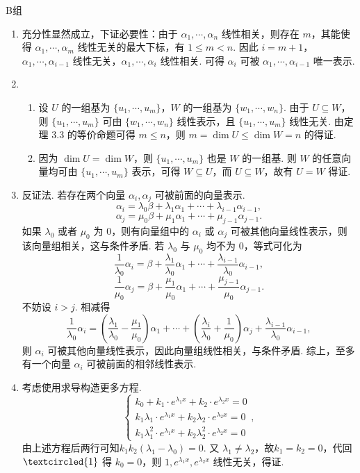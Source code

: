 \centerline{\heiti B组}
\begin{enumerate}
    \item 充分性显然成立，下证必要性：由于 $\alpha_1,\cdots,\alpha_n$ 线性相关，则存在 $m$，其能使得 $\alpha_1,\cdots,\alpha_m$ 线性无关的最大下标，有 $1\le m<n$. 因此 $i=m+1$，$\alpha_1,\cdots,\alpha_{i-1}$ 线性无关，$\alpha_1,\cdots,\alpha_i$ 线性相关. 可得 $\alpha_i$ 可被 $\alpha_1,\cdots,\alpha_{i-1}$ 唯一表示.

    \item \begin{enumerate}
        \item 设 $U$ 的一组基为 $\{u_1,\cdots,u_m\}$，$W$ 的一组基为 $\{w_1,\cdots,w_n\}$. 由于 $U\subseteq W$，则 $\{u_1,\cdots,u_m\}$ 可由 $\{w_1,\cdots,w_n\}$ 线性表示，且 $\{u_1,\cdots,u_m\}$ 线性无关. 由定理 $3.3$ 的等价命题可得 $m\le n$，则 $m=\dim U\le\dim W=n$ 的得证.
        \item 因为 $\dim U=\dim W$，则 $\{u_1,\cdots,u_m\}$ 也是 $W$ 的一组基. 则 $W$ 的任意向量均可由 $\{u_1,\cdots,u_m\}$ 表示，可得 $W\subseteq U$，而 $U\subseteq W$，故有 $U=W$ 得证.
    \end{enumerate}

    \item 反证法. 若存在两个向量 $\alpha_i,\alpha_j$ 可被前面的向量表示.
	\[\alpha_i=\lambda_0\beta+\lambda_1\alpha_1+\cdots+\lambda_{i-1}\alpha_{i-1},\]
	\[\alpha_j=\mu_0\beta+\mu_1\alpha_1+\cdots+\mu_{j-1}\alpha_{j-1}.\]
	如果 $\lambda_0$ 或者 $\mu_0$ 为 $0$，则有向量组中的 $\alpha_i$ 或 $\alpha_j$ 可被其他向量线性表示，则该向量组相关，这与条件矛盾. 若 $\lambda_0$ 与 $\mu_0$ 均不为 $0$，等式可化为
	\[\frac 1{\lambda_0}\alpha_i=\beta+\frac{\lambda_1}{\lambda_0}\alpha_1+\cdots+\frac{\lambda_{i-1}}{\lambda_0}\alpha_{i-1},\]
	\[\frac 1{\mu_0}\alpha_j=\beta+\frac{\mu_1}{\mu_0}\alpha_1+\cdots+\frac{\mu_{j-1}}{\mu_0}\alpha_{j-1}.\]
	不妨设 $i>j$. 相减得
	\[\frac 1{\lambda_0}\alpha_i=(\frac{\lambda_1}{\lambda_0}-\frac{\mu_1}{\mu_0})\alpha_1+\cdots+(\frac{\lambda_i}{\lambda_0}+\frac 1{\mu_0})\alpha_j+\frac{\lambda_{i-1}}{\lambda_0}\alpha_{i-1},\]
	则 $\alpha_i$ 可被其他向量线性表示，因此向量组线性相关，与条件矛盾. 综上，至多有一个向量 $\alpha_i$ 可被前面的相邻线性表示.

    \item 考虑使用求导构造更多方程.
	\[\begin{cases}
		k_0+k_1\cdot e^{\lambda_1 x}+k_2\cdot e^{\lambda_2 x}=0 \\
		k_1\lambda_1\cdot e^{\lambda_1 x}+k_2\lambda_2\cdot e^{\lambda_2 x}=0 \\
		k_1\lambda_1^2\cdot e^{\lambda_1 x}+k_2\lambda_2^2\cdot e^{\lambda_2 x}=0
	\end{cases},\]
	由上述方程后两行可知$k_1k_2(\lambda_1-\lambda_0)=0$. 又 $\lambda_1\ne\lambda_2$，故$k_1=k_2=0$，代回$\textcircled{1}$ 得 $k_0=0$，则 $1,e^{\lambda_1x},e^{\lambda_2x}$ 线性无关，得证.


\end{enumerate}
